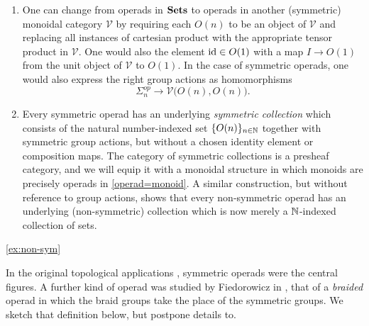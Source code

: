 \begin{rem}\label{rem:V-and-coll}
\begin{enumerate}
\item One can change from operads in $\mathbf{Sets}$ to operads in another (symmetric) monoidal category $\mathcal{V}$ by requiring each $O(n)$ to be an object of $\mathcal{V}$ and replacing all instances of cartesian product with the appropriate tensor product in $\mathcal{V}$. One would also the element $\textrm{id} \in O(1)$ with a map $I \rightarrow O(1)$ from the unit object of $\mathcal{V}$ to $O(1)$. In the case of symmetric operads, one would also express the right group actions as homomorphisms
\[
\Sigma_n^{op} \to \mathcal{V}\big( O(n), O(n) \big).
\]
\item Every symmetric operad has an underlying \textit{symmetric collection} which consists of the natural number-indexed set $\{ O(n) \}_{n \in \mathbb{N}}$ together with symmetric group actions, but without a chosen identity element or composition maps. The category of symmetric collections is a presheaf category, and we will equip it with a monoidal structure in which monoids are precisely operads in \cref{operad=monoid}. A similar construction, but without reference to group actions, shows that every non-symmetric operad has an underlying (non-symmetric) collection which is now merely a $\mathbb{N}$-indexed collection of sets.
\end{enumerate}
\end{rem}

\begin{example}\label{ex:non-sym}
\end{example}

\cref{ex:non-sym}

In the original topological applications \cite{maygeom}, symmetric operads were the central figures. A further kind of operad was studied by Fiedorowicz in \cite{fie-br}, that of a \emph{braided} operad in which the braid groups take the place of the symmetric groups. We sketch that definition below, but postpone details to.

